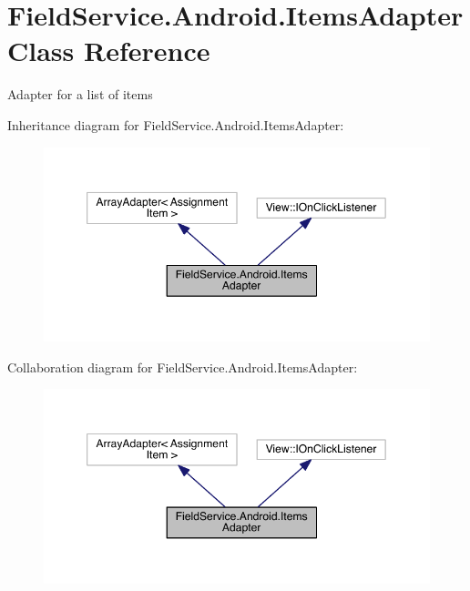 \hypertarget{class_field_service_1_1_android_1_1_items_adapter}{\section{Field\+Service.\+Android.\+Items\+Adapter Class Reference}
\label{class_field_service_1_1_android_1_1_items_adapter}
}


Adapter for a list of items  




Inheritance diagram for Field\+Service.\+Android.\+Items\+Adapter\+:
\nopagebreak
\begin{figure}[H]
\begin{center}
\leavevmode
\includegraphics[width=349pt]{class_field_service_1_1_android_1_1_items_adapter__inherit__graph}
\end{center}
\end{figure}


Collaboration diagram for Field\+Service.\+Android.\+Items\+Adapter\+:
\nopagebreak
\begin{figure}[H]
\begin{center}
\leavevmode
\includegraphics[width=349pt]{class_field_service_1_1_android_1_1_items_adapter__coll__graph}
\end{center}
\end{figure}
